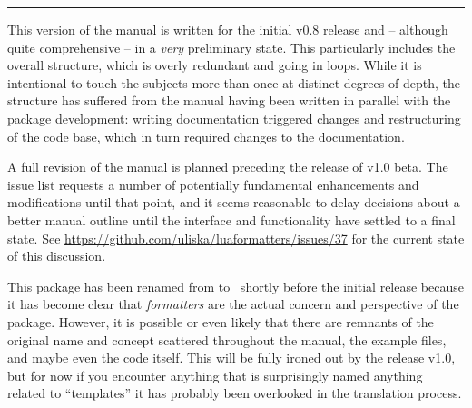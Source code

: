 \documentclass[12pt]{scrartcl}
\title{\luaformatters}
\subtitle{v0.8}
\author{Urs Liska}
\date{\HEADdate}
\begin{document}
\maketitle

\begin{abstract}

\luaformatters\ is a package for Lua\LaTeX\ assisting package (and document)
authors bridging the gap between the \LaTeX\ and the Lua domains.  It allows to
declare and program “formatters” completely in Lua files and have the
corresponding \LaTeX\ macros be generated automatically.  This reduces the
complexity of writing Lua-based packages and encourages (and simplifies) code
reuse and a modular programming style.

\end{abstract}

\hrule

\bigskip

\noindent {} This version of the manual is written for the
initial v0.8 release and -- although quite comprehensive -- in a \emph{very}
preliminary state. This particularly includes the overall structure, which is
overly redundant and going in loops. While it is intentional to touch the
subjects more than once at distinct degrees of depth, the structure has suffered
from the manual having been written in parallel with the package development:
writing documentation triggered changes and restructuring of the code base,
which in turn required changes to the documentation.

A full revision of the manual is planned preceding the release of v1.0 beta. The
issue list requests a number of potentially fundamental enhancements and
modifications until that point, and it seems reasonable to delay decisions about
a better manual outline until the interface and functionality have settled to a
final state.  See \url{https://github.com/uliska/luaformatters/issues/37} for
the current state of this discussion.

\medskip

\noindent {} This package has been renamed from
 to \luaformatters\ shortly before the initial release
because it has become clear that \emph{formatters} are the actual concern and
perspective of the package.  However, it is possible or even likely that there
are remnants of the original name and concept scattered throughout the manual,
the example files, and maybe even the code itself.  This will be fully ironed
out by the release v1.0, but for now if you encounter anything that is
surprisingly named anything related to “templates” it has probably been
overlooked in the translation process.
\end{document}
